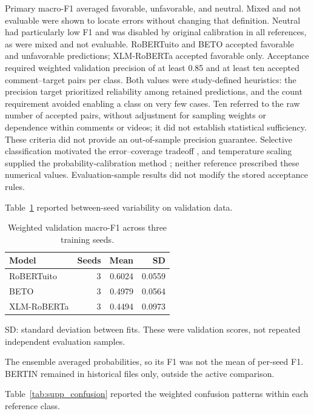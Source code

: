 \documentclass[11pt,a4paper]{article}
\begin{document}
Primary macro-F1 averaged favorable, unfavorable, and neutral. Mixed and not evaluable were shown to locate errors without changing that definition. Neutral had particularly low F1 and was disabled by original calibration in all references, as were mixed and not evaluable. RoBERTuito and BETO accepted favorable and unfavorable predictions; XLM-RoBERTa accepted favorable only. Acceptance required weighted validation precision of at least 0.85 and at least ten accepted comment--target pairs per class. Both values were study-defined heuristics: the precision target prioritized reliability among retained predictions, and the count requirement avoided enabling a class on very few cases. Ten referred to the raw number of accepted pairs, without adjustment for sampling weights or dependence within comments or videos; it did not establish statistical sufficiency. These criteria did not provide an out-of-sample precision guarantee. Selective classification motivated the error--coverage tradeoff \cite{Geifman2017Selective}, and temperature scaling supplied the probability-calibration method \cite{Guo2017Calibration}; neither reference prescribed these numerical values. Evaluation-sample results did not modify the stored acceptance rules.

Table~\ref{tab:supp_seeds} reported between-seed variability on validation data.

\begin{table}[H]\centering\small
\caption{Weighted validation macro-F1 across three training seeds.}
\label{tab:supp_seeds}
\setlength{\tabcolsep}{4pt}
\begin{tabular}{lrrr}\toprule
Model & Seeds & Mean & SD\\\midrule
RoBERTuito & 3 & 0.6024 & 0.0559\\
BETO & 3 & 0.4979 & 0.0564\\
XLM-RoBERTa & 3 & 0.4494 & 0.0973\\
\bottomrule\end{tabular}
\par\smallskip\footnotesize SD: standard deviation between fits. These were validation scores, not repeated independent evaluation samples.
\end{table}

The ensemble averaged probabilities, so its F1 was not the mean of per-seed F1. BERTIN remained in historical files only, outside the active comparison.

Table~\ref{tab:supp_confusion} reported the weighted confusion patterns within each reference class.
\end{document}
